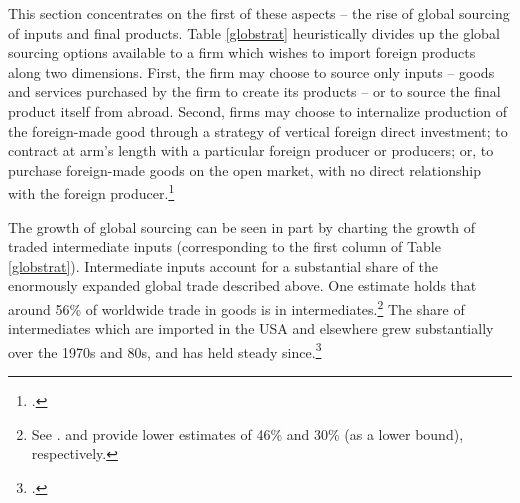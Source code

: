 \documentclass[hidelinks,12pt,letter]{article}
\begin{document}
This section concentrates on the first of these aspects -- the rise of global sourcing of inputs and final products. Table \ref{globstrat} heuristically divides up the global sourcing options available to a firm which wishes to import foreign products along two dimensions. First, the firm may choose to source only inputs -- goods and services purchased by the firm to create its products -- or to source the final product itself from abroad. %
Second, firms may choose to internalize production of the foreign-made good through a strategy of vertical foreign direct investment; to contract at arm's length with a particular foreign producer or producers; or, to purchase foreign-made goods on the open market, with no direct relationship with the foreign producer.\footnote{\citealt{antras2004global}.} %

The growth of global sourcing can be seen in part by charting the growth of traded intermediate inputs (corresponding to the first column of Table \ref{globstrat}). Intermediate inputs account for a substantial share of the enormously expanded global trade described above. One estimate holds that around 56\% of worldwide trade in goods is in intermediates.\footnote{See \citealt{miroudot2009trade}. \citealt{bergstrand2008growth} and \citealt{yeats1998just} provide lower estimates of 46\% and 30\% (as a lower bound), respectively.} The share of intermediates which are imported in the USA and elsewhere grew substantially over the 1970s and 80s, and has held steady since.\footnote{\citealt{feenstra1996globalization,campa1997evolving}. }
\end{document}
